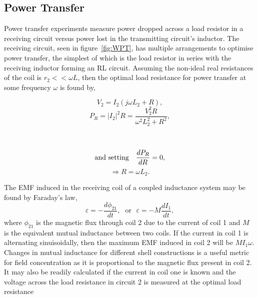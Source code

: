\documentclass[11pt]{iopart}
\begin{document}
\subsection{Power Transfer}
Power transfer experiments measure power dropped across a load
resistor in a receiving circuit versus power lost in the transmitting
circuit's inductor. The receiving circuit, seen in
figure~\ref{fig:WPT}, has multiple arrangements to optimise power
transfer, the simplest of which is the load resistor in series with
the receiving inductor forming an RL circuit. Assuming the non-ideal
real resistances of the coil is $r_2 << \omega L$, then the optimal
load resistance for power transfer at some frequency $\omega$ is found
by,
\vspace{-0.5em}
\begin{center}
\begin{minipage}{0.4\linewidth}
\begin{equation}
  V_2 = I_2 (j\omega L_2 + R),  
\end{equation}
\begin{equation}
  P_R = |I_2|^2R = \frac{V_2^2R}{\omega^2L_2^2 + R^2},
\end{equation}
\end{minipage}
~~
\vrule
\begin{minipage}{0.4\linewidth}
  $$\text{and setting\quad} \frac{dP_R}{dR} = 0,$$ 
\begin{equation}
  \Rightarrow R = \omega L_2.
  \label{eqn:RL-max}
\end{equation}
\end{minipage}
\end{center}
The EMF induced in the receiving coil of a coupled inductance system
may be found by Faraday's law,
\vspace{-0.5em}
\begin{equation}
  \varepsilon = -\frac{d\phi_{21}}{dt},~~~\text{or}~~~\varepsilon = -M\frac{dI_{1}}{dt},
  \label{eqn:M}
\end{equation}
where $\phi_{21}$ is the magnetic flux through coil 2 due to the
current of coil 1 and $M$ is the equivalent mutual inductance between
two coils.
If the current in coil 1 is alternating sinuisoidally, then the
maximum EMF induced in coil 2 will be $M I_1 \omega$. Changes in
mutual inductance for different shell constructions is a useful metric
for field concentration as it is proportional to the magnetic flux
present in coil 2. It may also be readily calculated if the current in
coil one is known and the voltage across the load resistance in
circuit 2 is measured at the optimal load resistance
\end{document}
